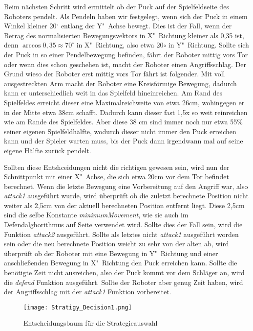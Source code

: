 Beim nächsten Schritt wird ermittelt ob der Puck auf der Spielfeldseite des Roboters pendelt. Als Pendeln haben wir festgelegt, wenn sich der Puck in einem Winkel kleiner 20$^\circ$ entlang der Y"~Achse bewegt. Dies ist der Fall, wenn der Betrag des normalisierten Bewegungsvektors in X"~Richtung kleiner als 0,35 ist, denn $\arccos 0,35 \approx 70^\circ$ in X"~Richtung, also etwa 20$\circ$ in Y"~Richtung. Sollte sich der Puck in so einer Pendelbewegung befinden, fährt der Roboter mittig vors Tor oder wenn dies schon geschehen ist, macht der Roboter einen Angriffsschlag. Der Grund wieso der Roboter erst mittig vors Tor fährt ist folgender. Mit voll ausgestreckten Arm macht der Roboter eine Kreisförmige Bewegung, dadurch kann er unterschiedlich weit in das Spielfeld hineinreichen. Am Rand des Spielfeldes erreicht dieser eine Maximalreichweite von etwa 26cm, wohingegen er in der Mitte etwa 38cm schafft. Dadurch kann dieser fast 1,5x so weit reinreichen wie am Rande des Spielfeldes.
Aber diese 38 cm sind immer noch nur etwa 55\% seiner eigenen Spielfeldhälfte, wodurch dieser nicht immer den Puck erreichen kann und der Spieler warten muss, bis der Puck dann irgendwann mal auf seine eigene Hälfte zurück pendelt.

Sollten diese Entshceidungen nicht die richtigen gewesen sein, wird nun der Schnittpunkt mit einer X"~Achse, die sich etwa 20cm vor dem Tor befindet berechnet. Wenn die letzte Bewegung eine Vorbereitung auf den Angriff war, also \textit{attack1} ausgeführt wurde, wird überprüft ob die zuletzt berechnete Position nicht weiter als 2,5cm von der aktuell berechneten Position entfernt liegt. Diese 2,5cm sind die selbe Konstante \textit{minimumMovement}, wie sie auch im Defendalghorithmus auf Seite \pageref{lst:defensivstrategie} verwendet wird. Sollte dies der Fall sein, wird die Funktion \textit{attack2} ausgeführt. Sollte als letztes nicht \textit{attack1} ausgeführt worden sein oder die neu berechnete Position weicht zu sehr von der alten ab, wird überprüft ob der Roboter mit eine Bewegung in Y"~Richtung und einer anschließenden Bewegung in X"~Richtung den Puck erreichen kann. Sollte die benötigte Zeit nicht ausreichen, also der Puck kommt vor dem Schläger an, wird die \textit{defend} Funktion ausgeführt. Sollte der Roboter aber genug Zeit haben, wird der Angriffsschlag mit der \textit{attack1} Funktion vorbereitet.

\begin{figure}[htbp]
	\texttt{[image: Stratigy\_Decision1.png]}
	\caption{Entscheidungsbaum für die Strategieauswahl}
	\label{img:Entscheidungsbaum Strategieauswahl}
\end{figure}